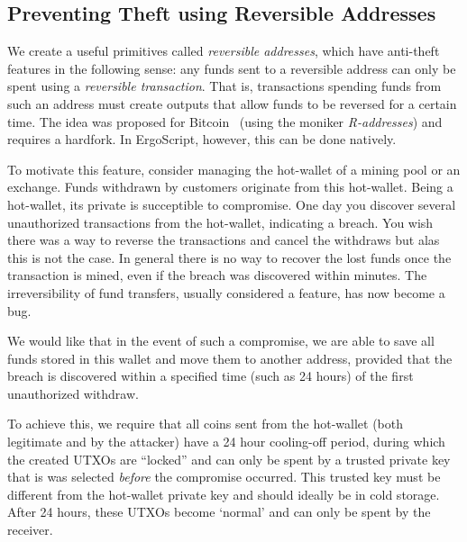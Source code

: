 \documentclass[11pt]{article}
\newcommand{\langname}{ErgoScript\xspace}
\begin{document}
\subsection{Preventing Theft using Reversible Addresses}

We create a useful primitives called {\em reversible addresses}, which have anti-theft features in the following sense:
any funds sent to a reversible address can only be spent using a {\em reversible transaction}. That is, transactions spending funds from such an address must create outputs that allow funds to be reversed for a certain time. The idea was proposed for Bitcoin~\cite{raddress} (using the moniker {\em R-addresses}) and requires a hardfork. In \langname, however, this can be done natively.

To motivate this feature, consider managing the hot-wallet of a mining pool or an exchange. Funds withdrawn by customers originate from this hot-wallet. Being a hot-wallet, its private is succeptible to compromise. One day you discover several unauthorized transactions from the hot-wallet, indicating a breach. You wish there was a way to reverse the transactions and cancel the withdraws but alas this is not the case. In general there is no way to recover the lost funds once the transaction is mined, even if the breach was discovered within minutes. The irreversibility of fund transfers, usually considered a feature, has now become a bug.

We would like that in the event of such a compromise, we are able to save all funds stored in this wallet and move them to another address, provided that the breach is discovered within a specified time (such as 24 hours) of the first unauthorized withdraw. 

To achieve this, we require that all coins sent from the hot-wallet (both legitimate and by the attacker)
have a 24 hour cooling-off period, during which the created UTXOs are ``locked'' and can only be spent by a trusted private key that is was selected {\em before} the compromise occurred. This trusted key must be different from the hot-wallet private key and should ideally be in cold storage. 
After 24 hours, these UTXOs become `normal' and can only be spent by the receiver.
\end{document}

